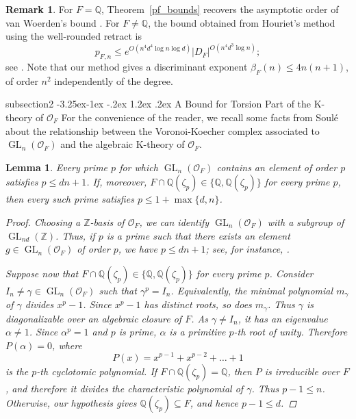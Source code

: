 \documentclass[11pt,a4paper,twoside]{amsart}
\makeatletter
\renewcommand{\subsection}{\@startsection
  {subsection}{2}{\z@}%
  {-3.25ex\@plus -1ex \@minus -.2ex}%
  {1.2ex \@plus .2ex}%
  {\normalfont\bfseries}}
\theoremstyle{plain}
\newtheorem{lemma}[theorem]{\bfseries Lemma}
\theoremstyle{definition}
\newtheorem{remark}[theorem]{\bfseries Remark}
\newcommand{\rint}[0]{\mathcal{O}_F}
\newcommand{\disc}[0]{D_F}
\newcommand{\GLo}[0]{\operatorname{GL}_n({\mathcal{O}_F})}
\renewcommand{\le}{\leqslant}
\renewcommand{\leq}{\leqslant}
\makeatother
\begin{document}
\begin{remark}
For $F=\mathbb Q$, Theorem~\ref{pf_bounds} recovers the asymptotic order of van Woerden's bound \cite[Theorem~3.1]{woerden}. For $F\neq\mathbb Q$, the bound obtained from Houriet's method using the well-rounded retract is
$$p_{F,n}\leq e^{O(n^4d^4\log n\log d)}|\disc|^{O(n^4d^3\log n)};$$
see \cite[Lemma~2.15 and Lemmas~4.1 and~4.2]{Juliet_PHD}. Note that our method gives a discriminant exponent $\beta_F(n)\leq4n(n+1)$, of order $n^2$ independently of the degree.
\end{remark}

\subsection{A Bound for Torsion Part of the K-theory of $\rint$}
For the convenience of the reader, we recall some facts from Soulé \cite{soule_bounds, soule_hermitian_bounds} about the relationship between the Voronoi-Koecher complex associated to $\GLo$ and the algebraic K-theory of $\rint$.

\begin{lemma}
\label{improved_cutoff}
Every prime $p$ for which $\GLo$ contains an element of
order $p$ satisfies $p\le dn+1$.
If, moreover, $F\cap\mathbb Q(\zeta_p)\in
\{\mathbb Q,\mathbb Q(\zeta_p)\}$
for every prime $p$, then every such prime satisfies
$p\le1+\max\{d,n\}$.
\begin{proof}
    Choosing a $\mathbb Z$-basis of $\rint$, we can identify $\GLo$ with a subgroup of $\operatorname{GL}_{nd}(\mathbb Z)$. Thus, if $p$ is a prime such that there exists an element $g\in\GLo$ of order $p$, we have $p\leq dn+1$; see, for instance, \cite[Lemma~7.1]{philippe_advances}.

    Suppose now that $F\cap\mathbb Q(\zeta_p)\in
\{\mathbb Q,\mathbb Q(\zeta_p)\}$ for every prime $p$.
Consider $I_n\neq\gamma\in\GLo$ such that
$\gamma^p=I_n$. Equivalently, the minimal polynomial
$m_\gamma$ of $\gamma$ divides $x^p-1$.
Since $x^p-1$ has distinct roots, so does $m_\gamma$.
Thus $\gamma$ is diagonalizable over an algebraic closure
of $F$. As $\gamma\neq I_n$, it has an eigenvalue
$\alpha\neq1$. Since $\alpha^p=1$ and $p$ is prime,
$\alpha$ is a primitive $p$-th root of unity.
Therefore $P(\alpha)=0$, where
$$
P(x)=x^{p-1}+x^{p-2}+\dots+1
$$
is the $p$-th cyclotomic polynomial.
If $F\cap\mathbb Q(\zeta_p)=\mathbb Q$, then $P$ is
irreducible over $F$, and therefore it divides the
characteristic polynomial of $\gamma$. Thus $p-1\le n$.
Otherwise, our hypothesis gives $\mathbb Q(\zeta_p)\subseteq F$,
and hence $p-1\le d$.
\end{proof}
\end{lemma}
\end{document}

